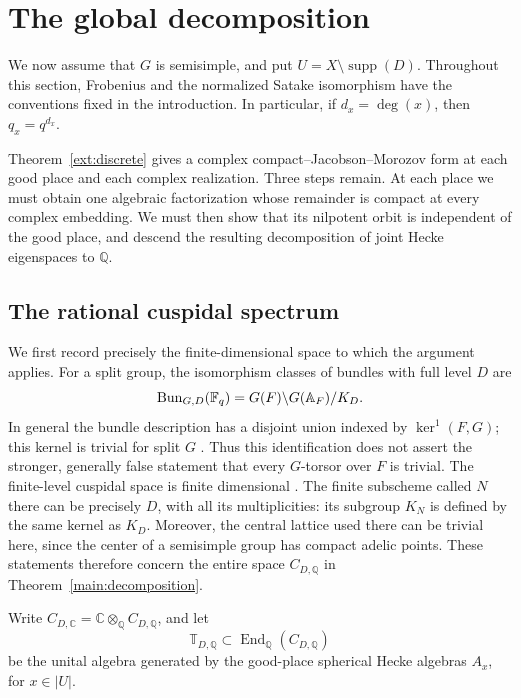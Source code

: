 \section{The global decomposition}
\label{sec:global}

We now assume that $G$ is semisimple, and put
$U=X\setminus\operatorname{supp}(D)$.  Throughout this section,
Frobenius and the normalized Satake isomorphism have the conventions
fixed in the introduction.  In particular, if $d_x=\deg(x)$, then
$q_x=q^{d_x}$.

Theorem~\ref{ext:discrete} gives a complex compact--Jacobson--Morozov
form at each good place and each complex realization.  Three steps
remain.  At each place we must obtain one algebraic factorization whose
remainder is compact at every complex embedding.  We must then show
that its nilpotent orbit is independent of the good place, and descend
the resulting decomposition of joint Hecke eigenspaces to $\mathbb Q$.

\subsection{The rational cuspidal spectrum}

We first record precisely the finite-dimensional space to which the
argument applies.  For a split group, the isomorphism classes of bundles
with full level $D$ are
\[
 \operatorname{Bun}_{G,D}(\mathbb F_q)
   =G(F)\backslash G(\mathbb A_F)/K_D.
\]
In general the bundle description has a disjoint union indexed by
$\ker^1(F,G)$; this kernel is trivial for split $G$
\cite[Section~2.1, Equation~(2.1), and Remark~2.2]{VLafforgue}.
Thus this identification does not assert the stronger, generally false
statement that every $G$-torsor over $F$ is trivial.
The finite-level cuspidal space is finite dimensional
\cite[Section~1.1]{VLafforgue}.  The finite subscheme called $N$ there
can be precisely $D$, with all its multiplicities: its subgroup
$K_N$ is defined by the same kernel as $K_D$.  Moreover, the central
lattice used there can be trivial here, since the center of a semisimple
group has compact adelic points.  These statements therefore concern
the entire space $C_{D,\mathbb Q}$ in Theorem~\ref{main:decomposition}.

Write $C_{D,\mathbb C}=\mathbb C\otimes_{\mathbb Q}C_{D,\mathbb Q}$,
and let
\[
 \mathbb T_{D,\mathbb Q}
 \subset\operatorname{End}_{\mathbb Q}(C_{D,\mathbb Q})
\]
be the unital algebra generated by the good-place spherical Hecke
algebras $A_x$, for $x\in |U|$.

